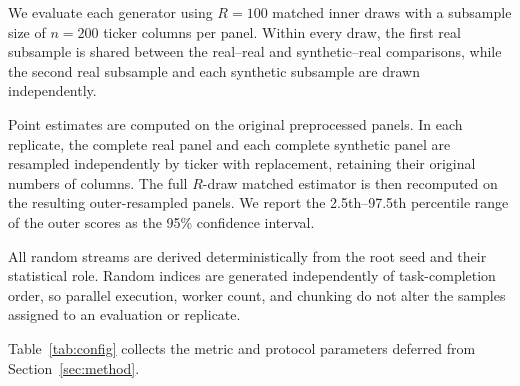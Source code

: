
We evaluate each generator using $R=100$ matched inner draws with a subsample size of $n=200$ ticker columns per panel. Within every draw, the first real subsample is shared between the real–real and synthetic–real comparisons, while the second real subsample and each synthetic subsample are drawn independently.

Point estimates are computed on the original preprocessed panels.  In each replicate, the complete real panel and each complete synthetic panel are resampled independently by ticker with replacement, retaining their original numbers of columns. The full $R$-draw matched estimator is then recomputed on the resulting outer-resampled panels. We report the 2.5th–97.5th percentile range of the outer scores as the 95\% confidence interval.


All random streams are derived deterministically from the root seed and their statistical role. Random indices are generated independently of task-completion order, so parallel execution, worker count, and chunking do not alter the samples assigned to an evaluation or replicate.

Table~\ref{tab:config} collects the metric and protocol parameters
deferred from Section~\ref{sec:method}.

